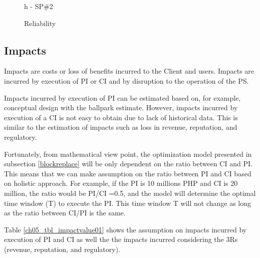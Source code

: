 \begin{figure}[!htb]
\begin{minipage}[b]{0.5\linewidth}
		\caption*{h - SP\#2}
	\end{minipage}
	\caption{Reliability}
	\label{ch05_fig_reliability}
\end{figure}



\subsection{Impacts}
Impacts are costs or loss of benefits incurred to the Client and users. Impacts are incurred by execution of PI or CI and by disruption to the operation of the PS.

Impacts incurred by execution of PI can be estimated based on, for example, conceptual design with the ballpark estimate. However, impacts incurred by execution of a CI is not easy to obtain due to lack of historical data. This is similar to the estimation of impacts such as loss in revenue, reputation, and regulatory.

Fortunately, from mathematical view point, the optimization model presented in subsection \ref{blockreplace} will be only dependent on the ratio between CI and PI. This means that we can make assumption on the ratio between PI and CI based on holistic approach. For example, if the PI is 10 millions PHP and CI is 20 million, the ratio would be PI/CI =0.5, and the model will determine the optimal time window (T) to execute the PI. This time window T will not change as long as the ratio between CI/PI is the same.

Table \ref{ch05_tbl_impactvalue01} shows the assumption on impacts incurred by execution of PI and CI as well the the impacts incurred considering the 3Rs (revenue, reputation, and regulatory).

